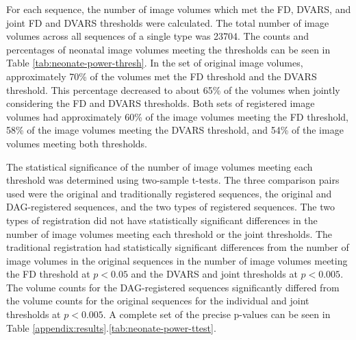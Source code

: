 For each sequence, the number of image volumes which met the FD, DVARS, and joint FD and DVARS thresholds were calculated. The total number of image volumes across all sequences of a single type was 23704. The counts and percentages of neonatal image volumes meeting the thresholds can be seen in Table \ref{tab:neonate-power-thresh}. In the set of original image volumes, approximately 70\% of the volumes met the FD threshold and the DVARS threshold. This percentage decreased to about 65\% of the volumes when jointly considering the FD and DVARS thresholds. Both sets of registered image volumes had approximately 60\% of the image volumes meeting the FD threshold, 58\% of the image volumes meeting the DVARS threshold, and 54\% of the image volumes meeting both thresholds.

The statistical significance of the number of image volumes meeting each threshold was determined using two-sample t-tests. The three comparison pairs used were the original and traditionally registered sequences, the original and DAG-registered sequences, and the two types of registered sequences. The two types of registration did not have statistically significant differences in the number of image volumes meeting each threshold or the joint thresholds. The traditional registration had statistically significant differences from the number of image volumes in the original sequences in the number of image volumes meeting the FD threshold at $p < 0.05$ and the DVARS and joint thresholds at $p < 0.005$. The volume counts for the DAG-registered sequences significantly differed from the volume counts for the original sequences for the individual and joint thresholds at $p < 0.005$. A complete set of the precise p-values can be seen in Table \ref{appendix:results}.\ref{tab:neonate-power-ttest}.

